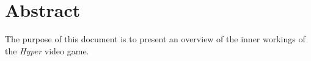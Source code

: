 \section{Abstract}
The purpose of this document is to present an overview of the inner workings of the \textit{Hyper} video game.